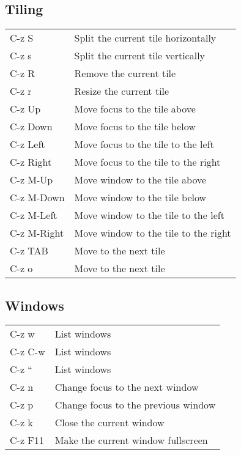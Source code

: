 \documentclass[10pt,a4paper,oneside]{article}
\begin{document}
\subsection{Tiling}
\begin{center}
  \begin{tabular}{|l|l|}
    \hline
    C-z S       & Split the current tile horizontally\\
    C-z s       & Split the current tile vertically\\
    C-z R       & Remove the current tile\\
    C-z r       & Resize the current tile\\
    C-z Up      & Move focus to the tile above\\
    C-z Down    & Move focus to the tile below\\
    C-z Left    & Move focus to the tile to the left\\
    C-z Right   & Move focus to the tile to the right\\
    C-z M-Up    & Move window to the tile above\\
    C-z M-Down  & Move window to the tile below\\
    C-z M-Left  & Move window to the tile to the left\\
    C-z M-Right & Move window to the tile to the right\\
    C-z TAB     & Move to the next tile\\
    C-z o       & Move to the next tile\\
    \hline 
  \end{tabular}
\end{center}

\subsection{Windows}
\begin{center}
  \begin{tabular}{|l|l|}
    \hline
    C-z w       & List windows\\
    C-z C-w     & List windows\\
    C-z ``      & List windows\\
    C-z n       & Change focus to the next window\\
    C-z p       & Change focus to the previous window\\
    C-z k       & Close the current window\\
    C-z F11     & Make the current window fullscreen\\
    \hline
  \end{tabular}
\end{center}
\end{document}
